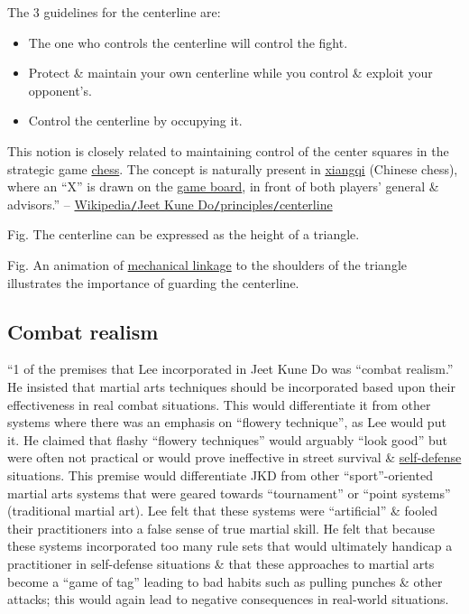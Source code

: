 \documentclass[oneside]{book}
\numberwithin{equation}{section}
\begin{document}
The 3 guidelines for the centerline are:
\begin{itemize}
	\item The one who controls the centerline will control the fight.
	\item Protect \& maintain your own centerline while you control \& exploit your opponent's.
	\item Control the centerline by occupying it.
\end{itemize}
This notion is closely related to maintaining control of the center squares in the strategic game \href{https://en.wikipedia.org/wiki/Chess}{chess}. The concept is naturally present in \href{https://en.wikipedia.org/wiki/Xiangqi}{xiangqi} (Chinese chess), where an ``X'' is drawn on the \href{https://en.wikipedia.org/wiki/Game_board}{game board}, in front of both players' general \& advisors.'' -- \href{https://en.wikipedia.org/wiki/Jeet_Kune_Do#Centerline}{Wikipedia\texttt{/}Jeet Kune Do\texttt{/}principles\texttt{/}centerline}

\textsf{Fig. The centerline can be expressed as the height of a triangle.}

\textsf{Fig. An animation of \href{https://en.wikipedia.org/wiki/Linkage_(mechanical)}{mechanical linkage} to the shoulders of the triangle illustrates the importance of guarding the centerline.}

\subsection{Combat realism}
``1 of the premises that Lee incorporated in Jeet Kune Do was ``combat realism.'' He insisted that martial arts techniques should be incorporated based upon their effectiveness in real combat situations. This would differentiate it from other systems where there was an emphasis on ``flowery technique'', as Lee would put it. He claimed that flashy ``flowery techniques'' would arguably ``look good'' but were often not practical or would prove ineffective in street survival \& \href{https://en.wikipedia.org/wiki/Self-defense}{self-defense} situations. This premise would differentiate JKD from other ``sport''-oriented martial arts systems that were geared towards ``tournament'' or ``point systems'' (traditional martial art). Lee felt that these systems were ``artificial'' \& fooled their practitioners into a false sense of true martial skill. He felt that because these systems incorporated too many rule sets that would ultimately handicap a practitioner in self-defense situations \& that these approaches to martial arts become a ``game of tag'' leading to bad habits such as pulling punches \& other attacks; this would again lead to negative consequences in real-world situations.
\end{document}
